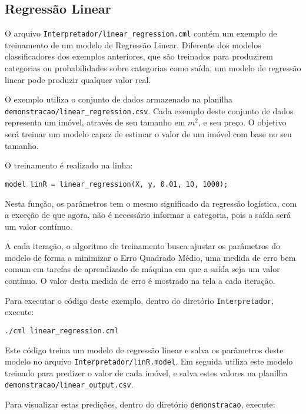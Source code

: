 \documentclass[12pt]{article}
\begin{document}
\subsection{Regressão Linear}

O arquivo \texttt{Interpretador/linear\_regression.cml} contém um exemplo de treinamento de um modelo de Regressão Linear. Diferente dos modelos classificadores dos exemplos anteriores, que são treinados para produzirem categorias ou probabilidades sobre categorias como saída, um modelo de regressão linear pode produzir qualquer valor real.

O exemplo utiliza o conjunto de dados armazenado na planilha \\ \texttt{demonstracao/linear\_regression.csv}. Cada exemplo deste conjunto de dados representa um imóvel, através de seu tamanho em $m^2$, e seu preço. O objetivo será treinar um modelo capaz de estimar o valor de um imóvel com base no seu tamanho.

O treinamento é realizado na linha:

\begin{verbatim}
model linR = linear_regression(X, y, 0.01, 10, 1000);
\end{verbatim}

Nesta função, os parâmetros tem o mesmo significado da regressão logística, com a exceção de que agora, não é necessário informar a categoria, pois a saída será um valor contínuo.

A cada iteração, o algoritmo de treinamento busca ajustar os parâmetros do modelo de forma a minimizar o Erro Quadrado Médio, uma medida de erro bem comum em tarefas de aprendizado de máquina em que a saída seja um valor contínuo. O valor desta medida de erro é mostrado na tela a cada iteração.

Para executar o código deste exemplo, dentro do diretório \texttt{Interpretador}, execute:

\begin{verbatim}
./cml linear_regression.cml
\end{verbatim}

Este código treina um modelo de regressão linear e salva os parâmetros deste modelo no arquivo \texttt{Interpretador/linR.model}. Em seguida utiliza este modelo treinado para predizer o valor de cada imóvel, e salva estes valores na planilha \texttt{demonstracao/linear\_output.csv}.

Para visualizar estas predições, dentro do diretório \texttt{demonstracao}, execute:
\end{document}
